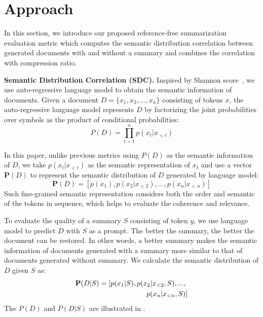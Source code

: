 \section{Approach}
In this section, we introduce our proposed reference-free summarization evaluation metric which computes the semantic distribution correlation between generated documents with and without a summary and combines the correlation with compression ratio.

\textbf{Semantic Distribution Correlation (SDC).}
Inspired by Shannon score~\cite{shannon22},
we use auto-regressive language model to obtain 
the semantic information of documents.
Given a document $D=\{x_1,x_2,...,x_n\}$ consisting of tokens $x$, 
the auto-regressive language model represents $D$ by
factorizing the joint probabilities over
symbols as the product of conditional probabilities: 
\begin{equation}
	P(D) = \prod_{t=1}^{n}p(x_t|x_{<t})
\end{equation}

In this paper, 
unlike previous metrics using $P(D)$ as the semantic information of $D$, 
we take $p(x_t|x_{<t})$ as the semantic representation of $x_t$
and use a vector $\mathbf{P}(D)$
to represent the semantic distribution of $D$ generated by language model:
\begin{equation}
	\mathbf{P}(D)=\left[p(x_1),p(x_2|x_{<2}),..., p(x_n|x_{<n})\right]
\end{equation}
Such fine-grained semantic representation considers
both the order and semantic of the tokens in sequence,
which helps to evaluate the coherence and relevance.

To evaluate the quality of a summary $S$ consisting of token $y$, we use language model
to predict $D$ with $S$ as a prompt.
The better the summary, the better the document can be restored.
In other words, a better summary makes the semantic information of documents generated with a summary more similar to that of documents generated without summary.
We calculate the semantic distribution of $D$ given $S$ as:
\begin{align}
\mathbf{P}(D|S)=\left[p(x_1|S),p(x_2|x_{<2},S),..., \notag\right.
\\
\left.
p(x_n|x_{<n},S)\right]
\end{align} 
The $P(D)$ and $P(D|S)$ are illustrated in .


